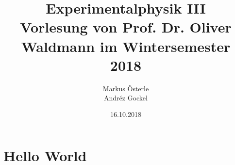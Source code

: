 \documentclass[titlepage,11pt,a4paper,ngerman]{report}
\begin{document}
	

\title{
	{\Huge Experimentalphysik III}\\[1em]
	{\Large Vorlesung von Prof. Dr. Oliver Waldmann im Wintersemester 2018}}
\author{Markus Österle\\ Andréz Gockel}
\date{16.10.2018}
\maketitle
\tableofcontents

\chapter{Hello World}




%
%
\end{document}
